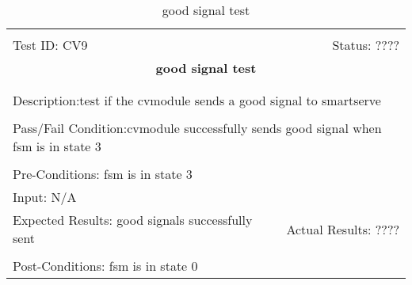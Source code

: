 \documentclass[11pt]{article}
\begin{document}
\begin{center}
\begin{table}[H]
\begin{tabular}{|l r|}\hline&\\[-2mm]
	Test ID: CV9	&Status: ????\\[-3mm]
	\multicolumn{2}{|c|}{\textbf{\large{good signal test}}}\\&\\\hline&\\[-3mm]
	\multicolumn{2}{|p{\textwidth}|}{Description:test if the cvmodule sends a good signal to smartserve}\\[1mm]\hline&\\[-3mm]
	\multicolumn{2}{|p{\textwidth}|}{Pass/Fail Condition:cvmodule successfully sends good signal when fsm is in state 3}\\[1mm]\hline&\\[-3mm]
	\multicolumn{2}{|p{\textwidth}|}{Pre-Conditions: fsm is in state 3}\\[4mm]
	\multicolumn{2}{|p{\textwidth}|}{Input: N/A}\\[2mm]\hline
	\multicolumn{1}{|p{0.49\textwidth}}{Expected Results: good signals successfully sent}	&\multicolumn{1}{|p{0.45\textwidth}|}{Actual Results: ????}\\\hline&\\[-3mm]
	\multicolumn{2}{|p{\textwidth}|}{Post-Conditions: fsm is in state 0}\\\hline
\end{tabular}
\caption{good signal test}
\end{table}
\end{center}
\end{document}
